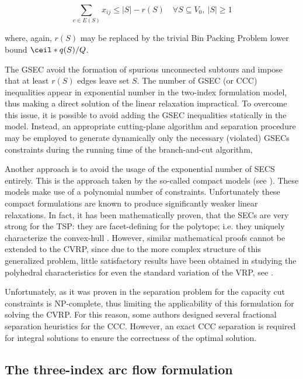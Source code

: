 \begin{equation}\label{eq:cvrp-2flow-gsec}
	\sum_{e \in E(S)} x_{ij} \le |S| - r(S) \quad \forall S \subseteq V_0,\ |S| \ge 1
\end{equation}

where, again, $r(S)$ may be replaced by the trivial Bin Packing Problem lower bound $\ceil*{q(S) / Q}$.

The GSEC avoid the formation of spurious unconnected subtours and impose that at least $r(S)$ edges leave set $S$.
The number of GSEC (or CCC) inequalities appear in exponential number in the two-index formulation model,
thus making a direct solution of the linear relaxation impractical.
To overcome this issue, it is possible to avoid adding the GSEC inequalities statically in the model.
Instead, an appropriate cutting-plane algorithm and separation procedure may be employed to generate dynamically
only the necessary (violated) GSECs constraints
during the running time of the branch-and-cut algorithm,

Another approach is to avoid the usage of the exponential number of SECS entirely.
This is the approach taken by the so-called compact models (see \cite{miller1960, christofides1979, desrochers1991}).
These models make use of a polynomial number of constraints.
Unfortunately these compact formulations are known to produce significantly weaker linear relaxations.
In fact, it has been mathematically proven,
that the SECs are very strong for the TSP: they are facet-defining for the polytope;
i.e. they uniquely characterize the convex-hull \parencite{grotschel1975}.
However, similar mathematical proofs cannot be extended to the CVRP,
since due to the more complex structure of this generalized problem,
little satisfactory results have been obtained in studying the polyhedral characteristics
for even the standard variation of the VRP, see \textcite{campos1991, cornuejols1993}.

Unfortunately, as it was proven in \textcite{augerat1995} the separation problem
for the capacity cut constraints is NP-complete, thus limiting the applicability
of this formulation for solving the CVRP.
For this reason, some authors \parencite{augerat1995, augerat1998, ralphs2003} designed
several fractional separation heuristics for the CCC.
However,
an exact CCC separation is required for integral solutions
to ensure the correctness of the optimal solution.


\subsection{The three-index arc flow formulation}
\label{sec:intro-cvrp-three-index-flow-formulation}

